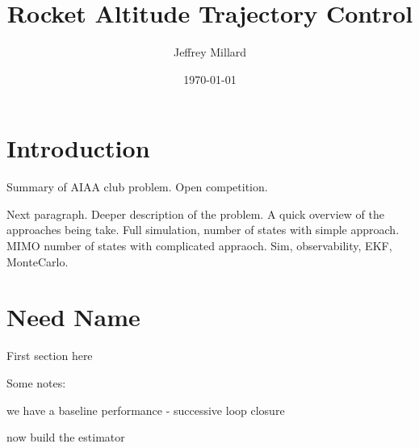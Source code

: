 \documentclass{article}
\title{Rocket Altitude Trajectory Control}
\date{\today}
\author{Jeffrey Millard}
\begin{document}
\maketitle


\section{Introduction}
  Summary of AIAA club problem. Open competition.

  Next paragraph. Deeper description of the problem. A quick overview of the approaches being take. Full simulation, number of states with simple approach. MIMO number of states with complicated appraoch. Sim, observability, EKF, MonteCarlo.

\section{Need Name}
  First section here

  Some notes:

  we have a baseline performance - successive loop closure

  now build the estimator
\end{document}
